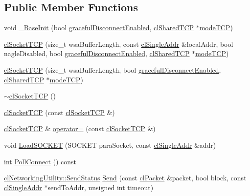 \subsection*{Public Member Functions}
\begin{DoxyCompactItemize}
\item 
void \hyperlink{classcl_socket_t_c_p_acdc98f821bf186e1626e76fb9d25980b}{\_\-BaseInit} (bool \hyperlink{classcl_socket_t_c_p_a6e949c2c5e772c5b043ff92c22268753}{gracefulDisconnectEnabled}, \hyperlink{classcl_shared_t_c_p}{clSharedTCP} $\ast$\hyperlink{classcl_socket_t_c_p_ac2e53997bca4ebcb0486b29b40ad9e65}{modeTCP})
\item 
\hyperlink{classcl_socket_t_c_p_ab4aebf846356dc997509bfc1f9814da0}{clSocketTCP} (size\_\-t wsaBufferLength, const \hyperlink{classcl_single_addr}{clSingleAddr} \&localAddr, bool nagleDisabled, bool \hyperlink{classcl_socket_t_c_p_a6e949c2c5e772c5b043ff92c22268753}{gracefulDisconnectEnabled}, \hyperlink{classcl_shared_t_c_p}{clSharedTCP} $\ast$\hyperlink{classcl_socket_t_c_p_ac2e53997bca4ebcb0486b29b40ad9e65}{modeTCP})
\item 
\hyperlink{classcl_socket_t_c_p_a104b8bd6aa4481ca80be3278d7fcad3c}{clSocketTCP} (size\_\-t wsaBufferLength, bool \hyperlink{classcl_socket_t_c_p_a6e949c2c5e772c5b043ff92c22268753}{gracefulDisconnectEnabled}, \hyperlink{classcl_shared_t_c_p}{clSharedTCP} $\ast$\hyperlink{classcl_socket_t_c_p_ac2e53997bca4ebcb0486b29b40ad9e65}{modeTCP})
\item 
\hyperlink{classcl_socket_t_c_p_a458dc827a7d5d3c5f37a94791fc600e4}{$\sim$clSocketTCP} ()
\item 
\hyperlink{classcl_socket_t_c_p_a7b69c388602c39301c77bbd6a2705f42}{clSocketTCP} (const \hyperlink{classcl_socket_t_c_p}{clSocketTCP} \&)
\item 
\hyperlink{classcl_socket_t_c_p}{clSocketTCP} \& \hyperlink{classcl_socket_t_c_p_a6d6b01ca2de1b744684cf4c06b4135a2}{operator=} (const \hyperlink{classcl_socket_t_c_p}{clSocketTCP} \&)
\item 
void \hyperlink{classcl_socket_t_c_p_a276fcb218bb483a56f10e740b6c5b2e1}{LoadSOCKET} (SOCKET paraSocket, const \hyperlink{classcl_single_addr}{clSingleAddr} \&addr)
\item 
int \hyperlink{classcl_socket_t_c_p_ac4e2880d1cfd6e137ce062722016bd83}{PollConnect} () const 
\item 
\hyperlink{classcl_networking_utility_a19389cda12603396e03caa9d82073803}{clNetworkingUtility::SendStatus} \hyperlink{classcl_socket_t_c_p_a0bb0f55d6064c6e2eedb8aee4d42d211}{Send} (const \hyperlink{classcl_packet}{clPacket} \&packet, bool block, const \hyperlink{classcl_single_addr}{clSingleAddr} $\ast$sendToAddr, unsigned int timeout)

\end{DoxyCompactItemize}
